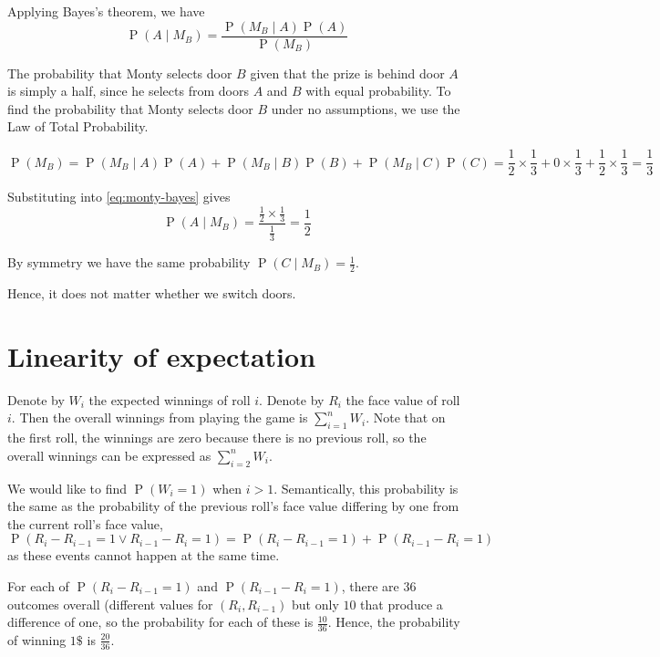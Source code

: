 \documentclass[letterpaper,11pt]{article}
\DeclareMathOperator{\Prob}{P}
\renewcommand{\P}[1]{\Prob{\parens{#1}}}
\newcommand{\parens}[1]{\left(#1\right)}
\newcommand{\given}{\;\vert\;}
\newcommand{\question}{\section}
\begin{document}
Applying Bayes's theorem, we have
\begin{equation}
    \label{eq:monty-bayes}
    \P{A \given M_B} = \frac{
        \P{M_B \given A} \P{A}
    }{
        \P{M_B}
    }
\end{equation}

The probability that Monty selects door $B$ given that the prize is behind door
$A$ is simply a half, since he selects from doors $A$ and $B$ with equal
probability. To find the probability that Monty selects door $B$ under no
assumptions, we use the Law of Total Probability.

\begin{equation*}
    \P{M_B}
    = \P{M_B \given A} \P{A}
    + \P{M_B \given B} \P{B}
    + \P{M_B \given C} \P{C}
    = \frac{1}{2} \times \frac{1}{3}
    + 0 \times \frac{1}{3}
    + \frac{1}{2} \times \frac{1}{3}
    = \frac{1}{3}
\end{equation*}

Substituting into \eqref{eq:monty-bayes} gives
\begin{equation*}
    \P{A \given M_B} = \frac{
        \frac{1}{2} \times \frac{1}{3}
    }{
        \frac{1}{3}
    }
    = \frac{1}{2}
\end{equation*}

By symmetry we have the same probability $\P{C \given M_B} = \frac{1}{2}$.

Hence, it does not matter whether we switch doors.

\question{Linearity of expectation}

Denote by $W_i$ the expected winnings of roll $i$.
Denote by $R_i$ the face value of roll $i$.
Then the overall winnings from playing the game is $\sum_{i=1}^n W_i$.
Note that on the first roll, the winnings are zero because there is no previous
roll, so the overall winnings can be expressed as $\sum_{i=2}^n W_i$.

We would like to find $\P{W_i = 1}$ when $i > 1$.
Semantically, this probability is the same as the probability of the previous
roll's face value differing by one from the current roll's face value,
\begin{equation*}
    \P{R_i - R_{i-1} = 1 \lor R_{i-1} - R_i = 1}
    = \P{R_i - R_{i-1} = 1} + \P{R_{i-1} - R_i = 1}
\end{equation*}
as these events cannot happen at the same time.

For each of $\P{R_i - R_{i-1} = 1}$ and $\P{R_{i-1} - R_i = 1}$, there are $36$
outcomes overall (different values for $(R_i, R_{i-1})$ but only $10$ that
produce a difference of one, so the probability for each of these is
$\frac{10}{36}$.
Hence, the probability of winning $ 1\$ $ is $\frac{20}{36}$.
\end{document}
